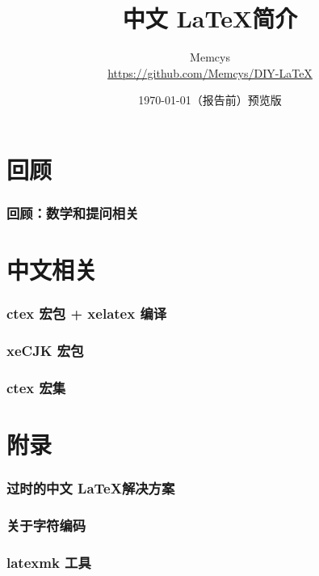 \documentclass{ctexart}
\title{中文 \LaTeX 简介}
\author{Memcys \\ \url{https://github.com/Memcys/DIY-LaTeX}}
\date{\today \qquad （报告前）预览版}
\begin{document}
\maketitle

\part{回顾}

\setcounter{section}{-1}
\section{回顾：数学和提问相关}


\tableofcontents
\clearpage

\part{中文相关}

\section{ctex 宏包 + xelatex 编译}


\section{xeCJK 宏包}


\section{ctex 宏集}


\part{附录}
\appendix
\section[过时的中文方案]{过时的中文 \LaTeX 解决方案}


\section{关于字符编码}


\section{latexmk 工具}\label{ap:latexmk}

\end{document}
